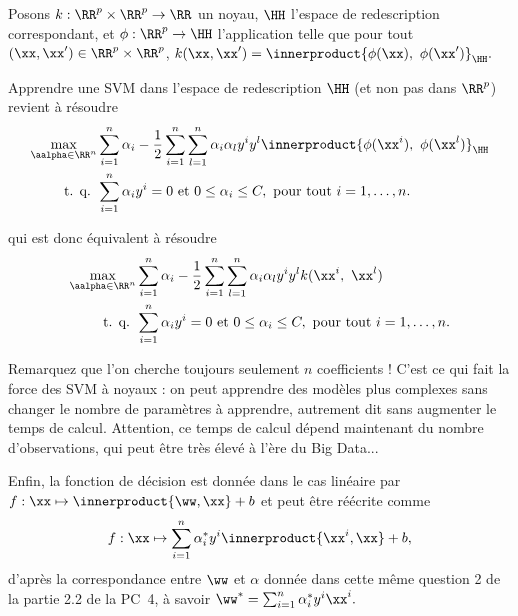 Posons $k: \RR^p \times \RR^p \rightarrow \RR$ un noyau, $\HH$ l'espace de
redescription correspondant, et $\phi: \RR^p \rightarrow \HH$ l'application
telle que pour tout $(\xx, \xx^\prime) \in \RR^p \times \RR^p$, $k(\xx, \xx^\prime) = \innerproduct{\phi(\xx),~\phi(\xx^\prime)}_\HH.$

Apprendre une SVM dans l'espace de redescription $\HH$ (et non pas dans $\RR^p$) revient à résoudre 
\begin{align}
  \label{eq:soft-margin-dual-pb-featspace}
  \max_{\aalpha \in \RR^n} & 
                           \sum_{i=1}^n  \alpha_i- 
                           \frac{1}{2} \sum_{i=1}^n \sum_{l=1}^n \alpha_i \alpha_l y^i y^l \innerproduct{\phi(\xx^i),~\phi(\xx^l)}_\HH \\
  \nonumber \text{ t. q. } & \sum_{i=1}^n \alpha_i y^i = 0 \text{ et }  0 \leq \alpha_i
                             \leq C, \text{ pour tout } i=1, \dots, n.
\end{align}

qui est donc équivalent à résoudre
\begin{align}
  \label{eq:kernel-svm-dual-pb}
  \max_{\aalpha \in \RR^n} & 
                           \sum_{i=1}^n  \alpha_i- 
                           \frac{1}{2} \sum_{i=1}^n \sum_{l=1}^n \alpha_i \alpha_l y^i y^l k(\xx^i,~\xx^l) \\
  \nonumber \text{ t. q. } & \sum_{i=1}^n \alpha_i y^i = 0 \text{ et }  0 \leq \alpha_i
                             \leq C, \text{ pour tout } i=1, \dots, n.
\end{align}

Remarquez que l'on cherche toujours seulement $n$ coefficients ! C'est ce qui
fait la force des SVM à noyaux : on peut apprendre des modèles plus complexes
sans changer le nombre de paramètres à apprendre, autrement dit sans augmenter
le temps de calcul. Attention, ce temps de calcul dépend maintenant du nombre
d'observations, qui peut être très élevé à l'ère du Big Data...

Enfin, la fonction de décision est donnée dans le cas linéaire par
$  f: \xx \mapsto \innerproduct{\ww, \xx} + b$ et 
peut être réécrite comme 
\begin{equation*}
  f: \xx \mapsto \sum_{i=1}^n \alpha_i^* y^i \innerproduct{\xx^i, \xx} + b,
\end{equation*}
d'après la correspondance entre $\ww$ et $\alpha$ donnée dans cette même
question 2 de la partie 2.2 de la PC~4, à savoir
$\ww^* = \sum_{i=1}^n \alpha_i^* y^i \xx^i.$

